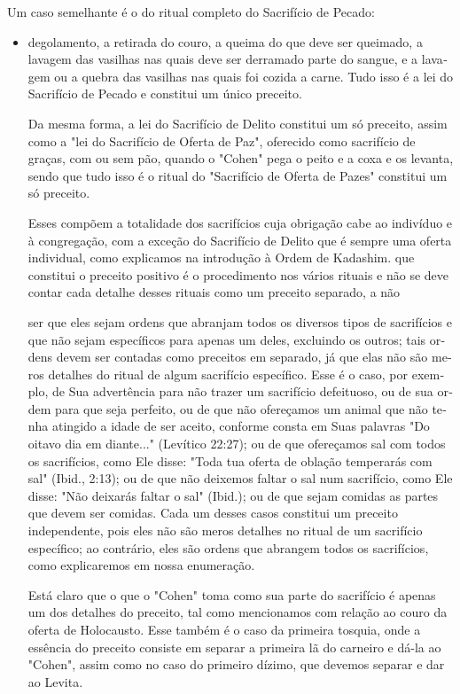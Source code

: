 \begin{itemize}
\begin{enumrate}
Um caso semelhante é o do ritual completo do Sacrifício de Pecado:

\begin{itemize}
\item
 
 degolamento, a retirada do couro, a queima do que deve ser queimado, a
 lavagem das vasilhas nas quais deve ser derramado parte do sangue, e a
 lava­gem ou a quebra das vasilhas nas quais foi cozida a carne. Tudo
 isso é a lei do Sacrifício de Pecado e constitui um único preceito.


Da mesma forma, a lei do Sacrifício de Delito constitui um só pre­ceito,
assim como a "lei do Sacrifício de Oferta de Paz", oferecido como
sacri­fício de graças, com ou sem pão, quando o "Cohen" pega o peito e a
coxa e os levanta, sendo que tudo isso é o ritual do "Sacrifício de
Oferta de Pazes"
 constitui um só preceito.


Esses compõem a totalidade dos sacrifícios cuja obrigação cabe ao
indivíduo e à congregação, com a exceção do Sacrifício de Delito que é
sempre uma oferta individual, como explicamos na introdução à Ordem de
Kadashim.
 que constitui o preceito positivo é o procedimento nos vários rituais
 e não se deve contar cada detalhe desses rituais como um preceito
 separado, a não



ser que eles sejam ordens que abranjam todos os diversos tipos de
sacrifícios e que não sejam específicos para apenas um deles, excluindo
os outros; tais or­dens devem ser contadas como preceitos em separado,
já que elas não são me­ros detalhes do ritual de algum sacrifício
específico. Esse é o caso, por exem­plo, de Sua advertência para não
trazer um sacrifício defeituoso, ou de sua or­dem para que seja
perfeito, ou de que não ofereçamos um animal que não te­nha atingido a
idade de ser aceito, conforme consta em Suas palavras "Do oita­vo dia em
diante..." (Levítico 22:27); ou de que ofereçamos sal com todos os
sacrifícios, como Ele disse: "Toda tua oferta de oblação temperarás com
sal" (Ibid., 2:13); ou de que não deixemos faltar o sal num sacrifício,
como Ele dis­se: "Não deixarás faltar o sal" (Ibid.); ou de que sejam
comidas as partes que devem ser comidas. Cada um desses casos constitui
um preceito independen­te, pois eles não são meros detalhes no ritual de
um sacrifício específico; ao contrário, eles são ordens que abrangem
todos os sacrifícios, como explicare­mos em nossa enumeração.

Está claro que o que o "Cohen" toma como sua parte do sacrifício é
apenas um dos detalhes do preceito, tal como mencionamos com relação ao
couro da oferta de Holocausto. Esse também é o caso da primeira tosquia,
on­de a essência do preceito consiste em separar a primeira lã do
carneiro e dá-la ao "Cohen", assim como no caso do primeiro dízimo, que
devemos separar e dar ao Levita.


\end{itemize}
\end{enumrate}
\end{itemize}

